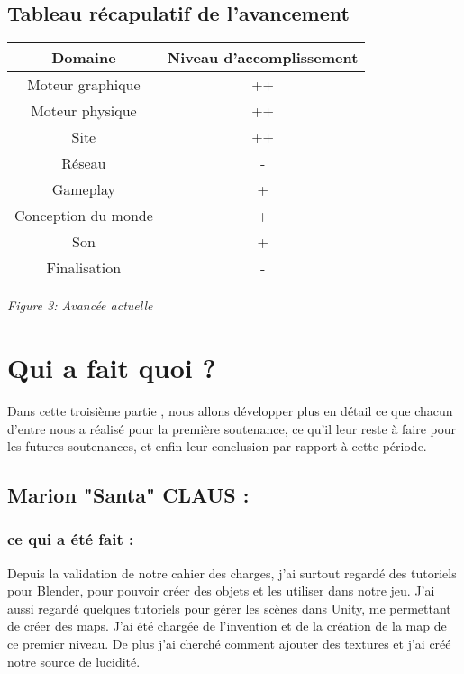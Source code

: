 \documentclass[a4paper]{article}
\begin{document}
\quad

	\subsection{Tableau récapulatif de l'avancement}

\begin{tabular}{|c|c|}
\hline Domaine & Niveau d'accomplissement \\
\hline Moteur graphique & ++ \\
\hline Moteur physique & ++ \\
\hline Site & ++\\
\hline Réseau & -\\
\hline Gameplay & +\\
\hline Conception du monde & + \\
\hline Son & + \\
\hline Finalisation & - \\
\hline
\end {tabular}


\begin{center}

\textit{Figure 3: Avancée actuelle}

\end{center}

\newpage

\section{Qui a fait quoi ?}

\quad

    Dans cette troisième partie , nous allons développer plus en détail ce que chacun d’entre nous a réalisé pour la première soutenance, ce qu’il leur reste à faire pour les futures soutenances, et enfin leur conclusion par rapport à cette période.

\quad

	\subsection{Marion "Santa" CLAUS :}

\quad

		\subsubsection{ce qui a été fait :}

\quad

Depuis la validation de notre cahier des charges, j'ai surtout regardé des tutoriels pour Blender, pour pouvoir créer des objets et les utiliser dans notre jeu. J'ai aussi regardé quelques tutoriels pour gérer les scènes dans Unity, me permettant de créer des maps. J'ai été chargée de l'invention et de la création de la map de ce premier niveau. De plus j'ai cherché comment ajouter des textures et j'ai créé notre source de lucidité.
\end{document}
